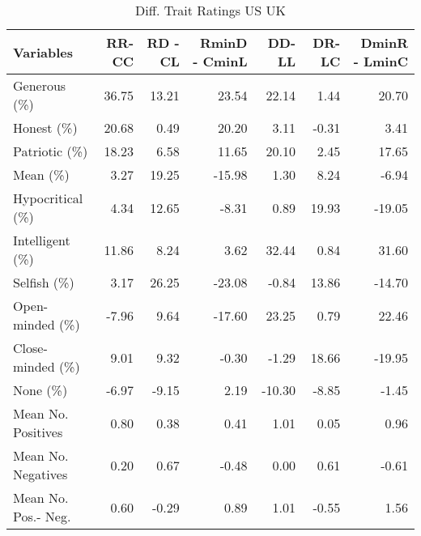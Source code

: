 \documentclass[a4paper]{article}
\begin{document}
\begin{table}[ht]
\begin{center}
\caption{Diff. Trait Ratings US UK}
\label{tab:one2}
\begin{tabular}{lrrrrrr}
  \hline
Variables & RR-CC & RD - CL & RminD - CminL & DD-LL & DR-LC & DminR - LminC \\ 
  \hline
Generous (\%) & 36.75 & 13.21 & 23.54 & 22.14 & 1.44 & 20.70 \\ 
  Honest (\%) & 20.68 & 0.49 & 20.20 & 3.11 & -0.31 & 3.41 \\ 
  Patriotic (\%) & 18.23 & 6.58 & 11.65 & 20.10 & 2.45 & 17.65 \\ 
  Mean (\%) & 3.27 & 19.25 & -15.98 & 1.30 & 8.24 & -6.94 \\ 
  Hypocritical (\%) & 4.34 & 12.65 & -8.31 & 0.89 & 19.93 & -19.05 \\ 
  Intelligent (\%) & 11.86 & 8.24 & 3.62 & 32.44 & 0.84 & 31.60 \\ 
  Selfish (\%) & 3.17 & 26.25 & -23.08 & -0.84 & 13.86 & -14.70 \\ 
  Open-minded (\%) & -7.96 & 9.64 & -17.60 & 23.25 & 0.79 & 22.46 \\ 
  Close-minded (\%) & 9.01 & 9.32 & -0.30 & -1.29 & 18.66 & -19.95 \\ 
  None (\%) & -6.97 & -9.15 & 2.19 & -10.30 & -8.85 & -1.45 \\ 
  Mean No. Positives & 0.80 & 0.38 & 0.41 & 1.01 & 0.05 & 0.96 \\ 
  Mean No. Negatives & 0.20 & 0.67 & -0.48 & 0.00 & 0.61 & -0.61 \\ 
  Mean No. Pos.- Neg. & 0.60 & -0.29 & 0.89 & 1.01 & -0.55 & 1.56 \\ 
   \hline
\end{tabular}
\end{center}
\end{table}\clearpage
\end{document}
